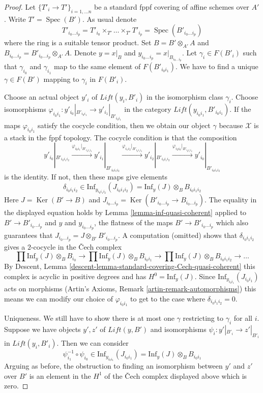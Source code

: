 \documentclass{stacks-project}
\theoremstyle{plain}
\theoremstyle{definition}
\theoremstyle{remark}
\numberwithin{equation}{subsection}
\def\Spec{\mathop{\mathrm{Spec}}}
\def\Ker{\mathop{\mathrm{Ker}}}
\begin{document}
\begin{proof}
Let $\{T'_i \to T'\}_{i = 1, \ldots n}$ be a standard fppf covering
of affine schemes over $A'$. Write $T' = \Spec(B')$. As usual denote
$$
T'_{i_0 \ldots i_p} =
T'_{i_0} \times_{T'} \ldots \times_{T'} T'_{i_p} = \Spec(B'_{i_0 \ldots i_p})
$$
where the ring is a suitable tensor product.
Set $B = B' \otimes_{A'} A$ and
$B_{i_0 \ldots i_p} = B'_{i_0 \ldots i_p} \otimes_{A'} A$.
Denote $y = x|_B$ and $y_{i_0 \ldots i_p} = x|_{B_{i_0 \ldots i_p}}$.
Let $\gamma_i \in F(B'_i)$ such that $\gamma_{i_0}$ and $\gamma_{i_1}$
map to the same element of $F(B'_{i_0i_1})$.
We have to find a unique $\gamma \in F(B')$ mapping to
$\gamma_i$ in $F(B'_i)$.

\medskip\noindent
Choose an actual object $y'_i$ of $\textit{Lift}(y_i, B'_i)$
in the isomorphism class $\gamma_i$.
Choose isomorphisms
$\varphi_{i_0i_1} : y'_{i_0}|_{B'_{i_0i_1}} \to y'_{i_1}|_{B'_{i_0i_1}}$
in the category $\textit{Lift}(y_{i_0i_1}, B'_{i_0i_1})$.
If the maps $\varphi_{i_0i_1}$ satisfy the cocycle condition,
then we obtain our object $\gamma$ because $\mathcal{X}$ is
a stack in the fppf topology. The cocycle condition is that the
composition
$$
y'_{i_0}|_{B'_{i_0i_1i_2}}
\xrightarrow{\varphi_{i_0i_1}|_{B'_{i_0i_1i_2}}}
y'_{i_1}|_{B'_{i_0i_1i_2}}
\xrightarrow{\varphi_{i_1i_2}|_{B'_{i_0i_1i_2}}}
y'_{i_2}|_{B'_{i_0i_1i_2}}
\xrightarrow{\varphi_{i_2i_0}|_{B'_{i_0i_1i_2}}}
y'_{i_0}|_{B'_{i_0i_1i_2}}
$$
is the identity. If not, then these maps give elements
$$
\delta_{i_0i_1i_2} \in
\text{Inf}_{y_{i_0i_1i_2}}(J_{i_0i_1i_2}) =
\text{Inf}_y(J) \otimes_B B_{i_0i_1i_2}
$$
Here $J = \Ker(B' \to B)$ and
$J_{i_0 \ldots i_p} = \Ker(B'_{i_0 \ldots i_p} \to B_{i_0 \ldots i_p})$.
The equality in the displayed equation holds by
Lemma \ref{lemma-inf-quasi-coherent} applied to
$B' \to B'_{i_0 \ldots i_p}$ and $y$ and $y_{i_0 \ldots i_p}$,
the flatness of the maps $B' \to B'_{i_0 \ldots i_p}$
which also guarantees that
$J_{i_0 \ldots i_p} = J \otimes_{B'} B'_{i_0 \ldots i_p}$.
A computation (omitted) shows that $\delta_{i_0i_1i_2}$ gives
a $2$-cocycle in the {\v C}ech complex
$$
\prod \text{Inf}_y(J) \otimes_B B_{i_0} \to
\prod \text{Inf}_y(J) \otimes_B B_{i_0i_1} \to
\prod \text{Inf}_y(J) \otimes_B B_{i_0i_1i_2} \to \ldots
$$
By Descent, Lemma \ref{descent-lemma-standard-covering-Cech-quasi-coherent}
this complex is acyclic in positive degrees and has $H^0 = \text{Inf}_y(J)$.
Since $\text{Inf}_{y_{i_0i_1}}(J_{i_0i_1})$ acts on
morphisms (Artin's Axioms, Remark \ref{artin-remark-automorphisms})
this means we can modify our choice of $\varphi_{i_0i_1}$
to get to the case where $\delta_{i_0i_1i_2} = 0$.

\medskip\noindent
Uniqueness. We still have to show there is at most one $\gamma$ restricting
to $\gamma_i$ for all $i$. Suppose we have objects $y', z'$ of
$\textit{Lift}(y, B')$ and isomorphisms $\psi_i : y'|_{B'_i} \to z'|_{B'_i}$
in $\textit{Lift}(y_i, B'_i)$. Then we can consider
$$
\psi_{i_1}^{-1} \circ \psi_{i_0} \in
\text{Inf}_{y_{i_0i_1}}(J_{i_0i_1}) =
\text{Inf}_y(J) \otimes_B B_{i_0i_1}
$$
Arguing as before, the obstruction to finding an isomorphism between
$y'$ and $z'$ over $B'$ is an element in the $H^1$ of the
{\v C}ech complex displayed above which is zero.
\end{proof}
\end{document}
